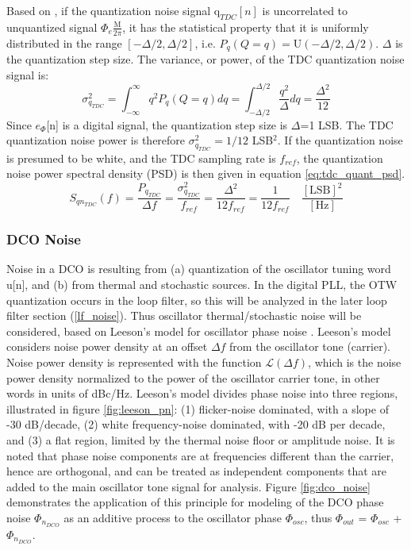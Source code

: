	\FloatBarrier
	Based on \cite{widrow_1961}, if the quantization noise signal $\mathrm{q}_{TDC}[n]$ is uncorrelated to unquantized signal $\Phi_e\frac{\mathrm{M}}{2\pi}$, it has the statistical property that it is uniformly distributed in the range $[-\Delta/2, \Delta/2]$, i.e. $P_q(Q=q) =\mathrm{U}(-\Delta/2, \Delta/2)$. $\Delta$ is the quantization step size. The variance, or power, of the TDC quantization noise signal is:
	\begin{equation}\label{eq:tdc_noise}
		\sigma_{q_{TDC}}^2 = \int_{-\infty}^\infty q^2P_q(Q=q)dq =  \int_{-\Delta/2}^{\Delta/2}\frac{q^2}{\Delta}dq = \frac{\Delta^2}{12}
	\end{equation}
	Since $e_\Phi$[n] is a digital signal, the quantization step size is $\Delta$=1 LSB. The TDC quantization noise power is therefore $\sigma_{q_{TDC}}^2 = 1/12$ LSB$^2$. If the quantization noise is presumed to be white, and the TDC sampling rate is $f_{ref}$, the quantization noise power spectral density (PSD) is then given in equation \ref{eq:tdc_quant_psd}. 
	\begin{equation}\label{eq:tdc_quant_psd}
		S_{qn_{TDC}}(f) = \frac{P_{q_{TDC}}}{\Delta f} = \frac{\sigma_{q_{TDC}}^2}{f_{ref}} = \frac{\Delta^2}{12f_{ref}} = \frac{1}{12f_{ref}} \hspace{1em}\frac{[\text{LSB}]^2}{[\text{Hz}]}
	\end{equation}

\subsubsection{DCO Noise}\label{dco_noise}
	Noise in a DCO is resulting from (a) quantization of the oscillator tuning word u[n], and (b) from thermal and stochastic sources. In the digital PLL, the OTW quantization occurs in the loop filter, so this will be analyzed in the later loop filter section (\ref{lf_noise}). Thus oscillator thermal/stochastic noise will be considered, based on Leeson's model for oscillator phase noise \cite{leeson_1966}. Leeson's model considers noise power density at an offset $\Delta f$ from the oscillator tone (carrier). Noise power density is represented with the function $\mathcal{L}(\Delta f)$, which is the noise power density normalized to the power of the oscillator carrier tone, in other words in units of dBc/Hz. Leeson's model divides phase noise into three regions, illustrated in figure \ref{fig:leeson_pn}: (1) flicker-noise dominated, with a slope of -30 dB/decade, (2) white frequency-noise dominated, with -20 dB per decade, and (3) a flat region, limited by the thermal noise floor or amplitude noise. It is noted that phase noise components are at frequencies different than the carrier, hence are orthogonal, and can be treated as independent components that are added to the main oscillator tone signal for analysis. Figure \ref{fig:dco_noise} demonstrates the application of this principle for modeling of the DCO phase noise $\Phi_{n_{DCO}}$ as an additive process to the oscillator phase $\Phi_{osc}$, thus $\Phi_{out}$ = $\Phi_{osc}$ + $\Phi_{n_{DCO}}$.


